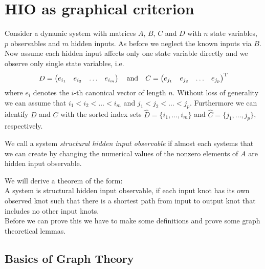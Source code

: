 \section{HIO as graphical criterion}

Consider a dynamic system with matrices $A$, $B$, $C$ and $D$ with $n$ state variables, 
$p$ observables and $m$ hidden inputs. As before we neglect the known inputs via $B$. 
Now assume each hidden input affects only one state variable directly and we observe only 
single state variables, i.e.
\begin{equation}
	D = \begin{pmatrix}
	 e_{i_1} & e_{i_2} & \hdots &  e_{i_m}
	\end{pmatrix} \quad \text{and} \quad
	C = \begin{pmatrix}
	e_{j_1} & e_{j_2} & \hdots & e_{j_p}
	\end{pmatrix}^\text{T}
\end{equation}
where $e_i$ denotes the $i$-th canonical vector of length $n$. Without loss of generality 
we can assume that $i_1<i_2<\ldots < i_m$ and $j_1<j_2<\ldots < j_p$. Furthermore we can 
identify $D$ and $C$ with the sorted index sets $\hat{D}=\{i_1,\ldots,i_m\}$ and 
$\hat{C}=\{j_1,\ldots,j_p\}$, respectively.

\begin{definition}{}{}	
	We call a system \textit{structural hidden input observable} if almost each systems 
	that we can create by changing the numerical values of the nonzero elements of $A$ are 
	hidden input observable.
\end{definition}

We will derive a theorem of the form:\\

	A system is structural hidden input observable, if each input knot has its own 
	observed knot such that there is a shortest path from input to output knot that 
	includes no other input knots.\\
	
Before we can prove this we have to make some definitions and prove some graph theoretical 
lemmas.

\subsection{Basics of Graph Theory}

